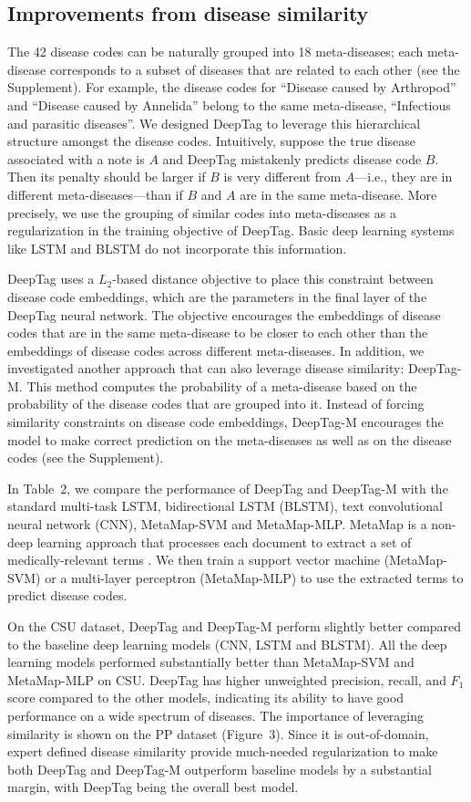 \documentclass{article}[11pt,oneside]
\begin{document}
\subsection*{Improvements from disease similarity}
The 42 disease codes can be naturally grouped into 18 meta-diseases; each meta-disease corresponds to a subset of diseases that are related to each other (see the Supplement). For example, the disease codes for ``Disease caused by Arthropod'' and ``Disease caused by Annelida'' belong to the same meta-disease, ``Infectious and parasitic diseases''. We designed DeepTag to leverage this hierarchical structure amongst the disease codes. Intuitively, suppose the true disease associated with a note is $A$ and DeepTag mistakenly predicts disease code $B$. Then its penalty should be larger if $B$ is very different from $A$---i.e., they are in different meta-diseases---than if $B$ and $A$ are in the same meta-disease. More precisely, we use the grouping of similar codes into meta-diseases as a regularization in the training objective of DeepTag. Basic deep learning systems like LSTM and BLSTM do not incorporate this information.

DeepTag uses a $L_2$-based distance objective to place this constraint between disease code embeddings, which are the parameters in the final layer of the DeepTag neural network. The objective encourages the embeddings of disease codes that are in the same meta-disease to be closer to each other than the embeddings of disease codes across different meta-diseases. In addition, we investigated another approach that can also leverage disease similarity: DeepTag-M. This method computes the probability of a meta-disease based on the probability of the disease codes that are grouped into it. Instead of forcing similarity constraints on disease code embeddings, DeepTag-M encourages the model to make correct prediction on the meta-diseases as well as on the disease codes (see the Supplement).

In Table~2, we compare the performance of DeepTag and DeepTag-M with the standard multi-task LSTM, bidirectional LSTM (BLSTM), text convolutional neural network (CNN), MetaMap-SVM and MetaMap-MLP. MetaMap is a non-deep learning approach that processes each document to extract a set of medically-relevant terms \cite{aronson2010overview}. We then train a support vector machine (MetaMap-SVM) or a multi-layer perceptron (MetaMap-MLP) to use the extracted terms to predict disease codes.

On the CSU dataset, DeepTag and DeepTag-M perform slightly better  compared to the baseline deep learning models (CNN, LSTM and BLSTM). All the deep learning models performed substantially better than MetaMap-SVM and MetaMap-MLP on CSU. DeepTag has higher unweighted precision, recall, and $F_1$ score compared to the other models, indicating its ability to have good performance on a wide spectrum of diseases. The importance of leveraging similarity is shown on the PP dataset (Figure~3).  Since it is out-of-domain, expert defined disease similarity provide much-needed regularization to make both DeepTag and DeepTag-M outperform baseline models by a substantial margin, with DeepTag being the overall best model. 
\end{document}
